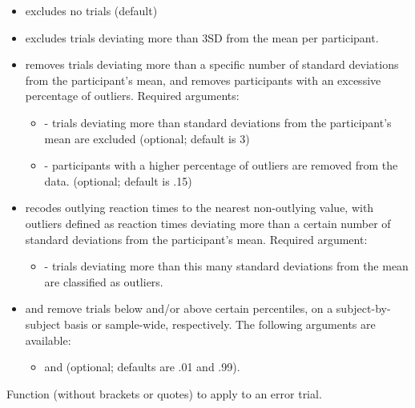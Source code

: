 \documentclass[a4paper]{book}
\begin{document}
\begin{Arguments}
\begin{ldescription}
\begin{itemize}
\item{}  excludes no trials (default)
\item{}  excludes trials deviating more than 3SD from the mean per participant.
\item{}  removes trials deviating more than a specific number of standard deviations from the participant's mean,
and removes participants with an excessive percentage of outliers.
Required arguments:
\begin{itemize}

\item{}  - trials deviating more than  standard deviations from the participant's mean are excluded (optional; default is 3)
\item{}  - participants with a higher percentage of outliers are removed from the data. (optional; default is .15)

\end{itemize}

\item{}  recodes outlying reaction times to the nearest non-outlying value,
with outliers defined as reaction times deviating more than a certain number of standard deviations from the participant's mean. Required argument:
\begin{itemize}

\item{}  - trials deviating more than this many standard deviations from the mean are classified as outliers.

\end{itemize}

\item{}  and  remove trials below and/or above certain percentiles,
on a subject-by-subject basis or sample-wide, respectively. The following arguments are available:
\begin{itemize}

\item{}  and  (optional; defaults are .01 and .99).

\end{itemize}


\end{itemize}


\item[\code{errortrialfunc}] Function (without brackets or quotes) to apply to an error trial.


\end{ldescription}
\end{Arguments}
\end{document}

